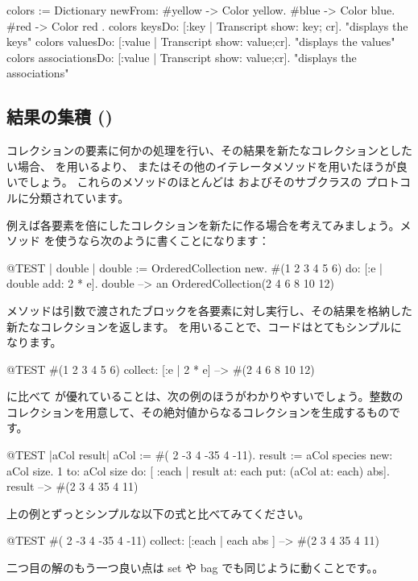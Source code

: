 \documentclass[a4paper,10pt,twoside]{book}
\begin{document}
\begin{code}{}
colors := Dictionary newFrom: { #yellow -> Color yellow. #blue -> Color blue. #red -> Color red }.
colors keysDo: [:key | Transcript show: key; cr].                    "displays the keys"
colors valuesDo: [:value | Transcript show: value;cr].            "displays the values"
colors associationsDo: [:value | Transcript show: value;cr].  "displays the associations"
\end{code}

\subsection{結果の集積 ()}
コレクションの要素に何かの処理を行い、その結果を新たなコレクションとしたい場合、 を用いるより、 またはその他のイテレータメソッドを用いたほうが良いでしょう。
これらのメソッドのほとんどは  およびそのサブクラスの  プロトコルに分類されています。

例えば各要素を倍にしたコレクションを新たに作る場合を考えてみましょう。メソッド  を使うなら次のように書くことになります：

\begin{code}{@TEST | double |}
double := OrderedCollection new.
#(1 2 3 4 5 6) do: [:e | double add: 2 * e].
double --> an OrderedCollection(2 4 6 8 10 12)
\end{code}

\noindent
{} メソッドは引数で渡されたブロックを各要素に対し実行し、その結果を格納した新たなコレクションを返します。
 を用いることで、コードはとてもシンプルになります。
\begin{code}{@TEST}
#(1 2 3 4 5 6) collect: [:e | 2 * e] --> #(2 4 6 8 10 12)
\end{code}

 に比べて  が優れていることは、次の例のほうがわかりやすいでしょう。整数のコレクションを用意して、その絶対値からなるコレクションを生成するものです。

\begin{code}{@TEST |aCol result|}
aCol :=  #( 2 -3 4 -35 4 -11).
result := aCol species new: aCol size.
1 to: aCol size do: [ :each | result at: each put: (aCol at: each) abs].
result --> #(2 3 4 35 4 11)
\end{code}
\noindent
上の例とずっとシンプルな以下の式と比べてみてください。
\begin{code}{@TEST}
#( 2 -3 4 -35 4 -11) collect: [:each | each abs ] --> #(2 3 4 35 4 11)
\end{code}
\noindent
二つ目の解のもう一つ良い点は set や bag でも同じように動くことです。。
\end{document}
